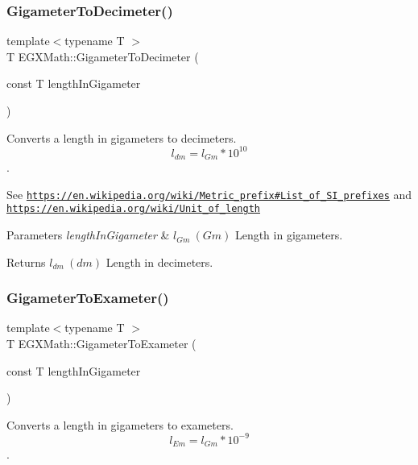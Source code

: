 \subsubsection{\texorpdfstring{Gigameter\+To\+Decimeter()}{GigameterToDecimeter()}}
{\footnotesize\ttfamily template$<$typename T $>$ \\
T E\+G\+X\+Math\+::\+Gigameter\+To\+Decimeter (\begin{DoxyParamCaption}\item[{const T}]{length\+In\+Gigameter }\end{DoxyParamCaption})}



Converts a length in gigameters to decimeters. \[ l_{dm}=l_{Gm} * 10^{10} \]. 

See \href{https://en.wikipedia.org/wiki/Metric_prefix#List_of_SI_prefixes}{\tt https\+://en.\+wikipedia.\+org/wiki/\+Metric\+\_\+prefix\#\+List\+\_\+of\+\_\+\+S\+I\+\_\+prefixes} and \href{https://en.wikipedia.org/wiki/Unit_of_length}{\tt https\+://en.\+wikipedia.\+org/wiki/\+Unit\+\_\+of\+\_\+length} 
\begin{DoxyParams}{Parameters}
{\em length\+In\+Gigameter} & $ l_{Gm}\ (Gm)$ Length in gigameters. \\
\hline
\end{DoxyParams}
\begin{DoxyReturn}{Returns}
$ l_{dm}\ (dm)$ Length in decimeters. 
\end{DoxyReturn}
\mbox{\label{group___e_g_x_math-_conversions-_length_conversions-_s_i-_gigameter-_s_i_ga38ebe6bd7f8d4dd09cadc8d08caf90eb}} 
\subsubsection{\texorpdfstring{Gigameter\+To\+Exameter()}{GigameterToExameter()}}
{\footnotesize\ttfamily template$<$typename T $>$ \\
T E\+G\+X\+Math\+::\+Gigameter\+To\+Exameter (\begin{DoxyParamCaption}\item[{const T}]{length\+In\+Gigameter }\end{DoxyParamCaption})}



Converts a length in gigameters to exameters. \[ l_{Em}=l_{Gm} * 10^{-9} \]. 

